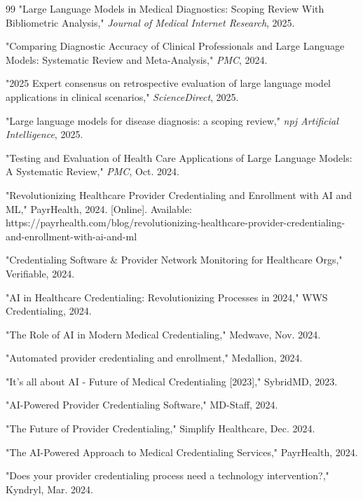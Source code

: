 \documentclass[conference]{IEEEtran}
\begin{document}
\begin{thebibliography}{99}
"Large Language Models in Medical Diagnostics: Scoping Review With Bibliometric Analysis," \textit{Journal of Medical Internet Research}, 2025.

"Comparing Diagnostic Accuracy of Clinical Professionals and Large Language Models: Systematic Review and Meta-Analysis," \textit{PMC}, 2024.

"2025 Expert consensus on retrospective evaluation of large language model applications in clinical scenarios," \textit{ScienceDirect}, 2025.

"Large language models for disease diagnosis: a scoping review," \textit{npj Artificial Intelligence}, 2025.

"Testing and Evaluation of Health Care Applications of Large Language Models: A Systematic Review," \textit{PMC}, Oct. 2024.

"Revolutionizing Healthcare Provider Credentialing and Enrollment with AI and ML," PayrHealth, 2024. [Online]. Available: https://payrhealth.com/blog/revolutionizing-healthcare-provider-credentialing-and-enrollment-with-ai-and-ml

"Credentialing Software \& Provider Network Monitoring for Healthcare Orgs," Verifiable, 2024.

"AI in Healthcare Credentialing: Revolutionizing Processes in 2024," WWS Credentialing, 2024.

"The Role of AI in Modern Medical Credentialing," Medwave, Nov. 2024.

"Automated provider credentialing and enrollment," Medallion, 2024.

"It's all about AI - Future of Medical Credentialing [2023]," SybridMD, 2023.

"AI-Powered Provider Credentialing Software," MD-Staff, 2024.

"The Future of Provider Credentialing," Simplify Healthcare, Dec. 2024.

"The AI-Powered Approach to Medical Credentialing Services," PayrHealth, 2024.

"Does your provider credentialing process need a technology intervention?," Kyndryl, Mar. 2024.


\end{thebibliography}
\end{document}

